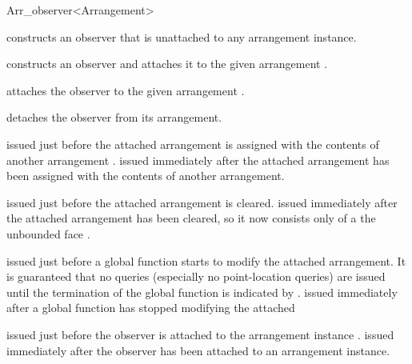 \begin{ccRefClass}{Arr_observer<Arrangement>}
\ccCreation
{}

    {constructs an observer that is unattached to any arrangement instance.}
 
    {constructs an observer and attaches it to the given arrangement 
     .}

\ccModifiers

    {attaches the observer to the given arrangement .}

    {detaches the observer from its arrangement.}



    {issued just before the attached arrangement is assigned with the contents
     of another arrangement .}
\ccGlue
{}
    {issued immediately after the attached arrangement has been assigned with
     the contents of another arrangement.}

    {issued just before the attached arrangement is cleared.}
\ccGlue
{}
    {issued immediately after the attached arrangement has been cleared, so it
     now consists only of a the unbounded face .}

    {issued just before a global function starts to modify the attached
     arrangement. It is guaranteed that no queries (especially no 
     point-location queries) are issued until the termination of the global
     function is indicated by .}
\ccGlue
{}
    {issued immediately after a global function has stopped modifying the
     attached}


    {issued just before the observer is attached to the arrangement instance
     .}
\ccGlue
{}
    {issued immediately after the observer has been attached to an
     arrangement instance.}


\end{ccRefClass}
